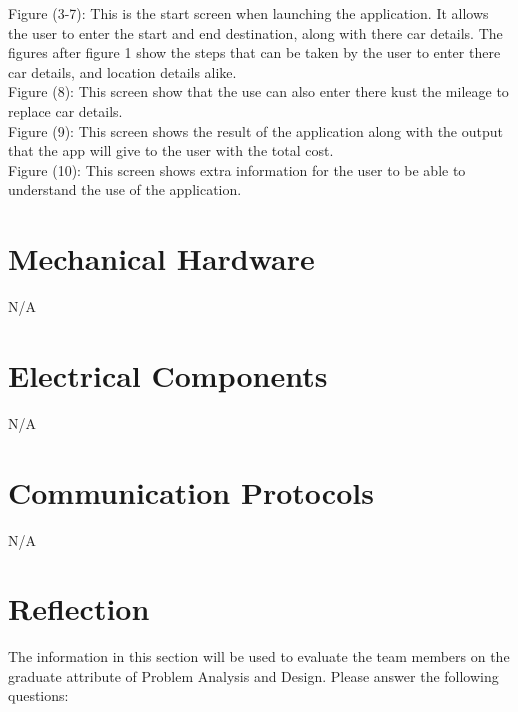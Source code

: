 \documentclass[12pt, titlepage]{article}
\begin{document}
Figure (3-7): This is the start screen when launching the application. It allows the user to enter the start and end destination, along with there car details. The figures after figure 1 show the steps that can be taken by the user to enter there car details, and location details alike.\\
Figure (8): This screen show that the use can also enter there kust the mileage to replace car details.\\
Figure (9): This screen shows the result of the application along with the output that the app will give to the user with the total cost.\\
Figure (10): This screen shows extra information for the user to be able to understand the use of the application.\\

\section{Mechanical Hardware}
N/A

\section{Electrical Components}
N/A

\section{Communication Protocols}
N/A

\section{Reflection}

The information in this section will be used to evaluate the team members on the
graduate attribute of Problem Analysis and Design.  Please answer the following questions:
\end{document}
